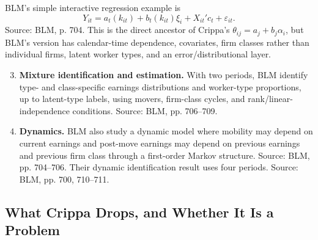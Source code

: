 \documentclass[11pt]{article}
\begin{document}
BLM's simple interactive regression example is
\[
Y_{it}=a_t(k_{it})+b_t(k_{it})\xi_i+X_{it}'c_t+\varepsilon_{it}.
\]
Source: BLM, p. 704. This is the direct ancestor of Crippa's
$\theta_{ij}=a_j+b_j\alpha_i$, but BLM's version has calendar-time dependence,
covariates, firm classes rather than individual firms, latent worker types, and an
error/distributional layer.

\begin{enumerate}
\setcounter{enumi}{2}
\item \textbf{Mixture identification and estimation.} With two periods, BLM identify
type- and class-specific earnings distributions and worker-type proportions, up to
latent-type labels, using movers, firm-class cycles, and rank/linear-independence
conditions. Source: BLM, pp. 706--709.

\item \textbf{Dynamics.} BLM also study a dynamic model where mobility may depend
on current earnings and post-move earnings may depend on previous earnings and
previous firm class through a first-order Markov structure. Source: BLM, pp. 704--706.
Their dynamic identification result uses four periods. Source: BLM, pp. 700, 710--711.
\end{enumerate}

\subsection{What Crippa Drops, and Whether It Is a Problem}
\end{document}
